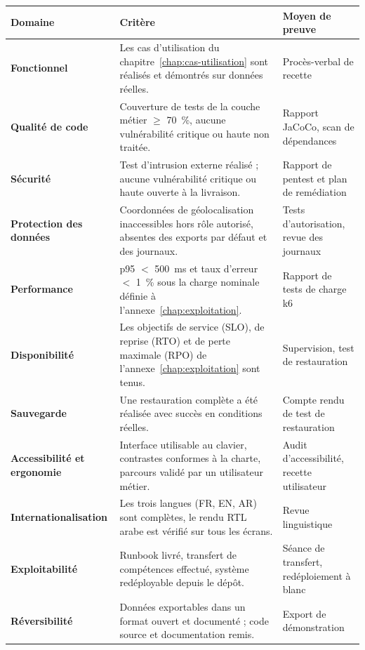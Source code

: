 \begin{xltabular}{\textwidth}{>{\bfseries}p{3.2cm} X p{3.4cm}}
\toprule
\textbf{Domaine} & \textbf{Critère} & \textbf{Moyen de preuve} \\
\midrule
\endhead
Fonctionnel & Les cas d'utilisation du chapitre~\ref{chap:cas-utilisation} sont réalisés et démontrés sur données réelles. & Procès-verbal de recette \\
\addlinespace
Qualité de code & Couverture de tests de la couche métier $\geq$ 70~\%, aucune vulnérabilité critique ou haute non traitée. & Rapport JaCoCo, scan de dépendances \\
\addlinespace
Sécurité & Test d'intrusion externe réalisé ; aucune vulnérabilité critique ou haute ouverte à la livraison. & Rapport de pentest et plan de remédiation \\
\addlinespace
Protection des données & Coordonnées de géolocalisation inaccessibles hors rôle autorisé, absentes des exports par défaut et des journaux. & Tests d'autorisation, revue des journaux \\
\addlinespace
Performance & p95 $<$ 500~ms et taux d'erreur $<$ 1~\% sous la charge nominale définie à l'annexe~\ref{chap:exploitation}. & Rapport de tests de charge k6 \\
\addlinespace
Disponibilité & Les objectifs de service (SLO), de reprise (RTO) et de perte maximale (RPO) de l'annexe~\ref{chap:exploitation} sont tenus. & Supervision, test de restauration \\
\addlinespace
Sauvegarde & Une restauration complète a été réalisée avec succès en conditions réelles. & Compte rendu de test de restauration \\
\addlinespace
Accessibilité et ergonomie & Interface utilisable au clavier, contrastes conformes à la charte, parcours validé par un utilisateur métier. & Audit d'accessibilité, recette utilisateur \\
\addlinespace
Internationalisation & Les trois langues (FR, EN, AR) sont complètes, le rendu RTL arabe est vérifié sur tous les écrans. & Revue linguistique \\
\addlinespace
Exploitabilité & Runbook livré, transfert de compétences effectué, système redéployable depuis le dépôt. & Séance de transfert, redéploiement à blanc \\
\addlinespace
Réversibilité & Données exportables dans un format ouvert et documenté ; code source et documentation remis. & Export de démonstration \\
\bottomrule
\end{xltabular}

